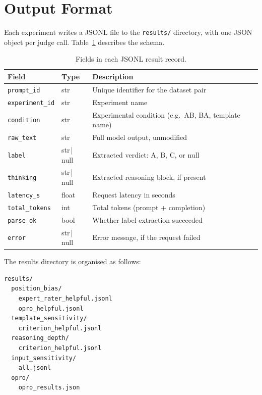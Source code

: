 \documentclass[11pt,a4paper]{article}
\begin{document}
\newpage
\section{Output Format}\label{sec:output}

Each experiment writes a JSONL file to the \texttt{results/} directory, with
one JSON object per judge call. Table~\ref{tab:fields} describes the schema.

\begin{table}[htbp]
\centering
\small
\caption{Fields in each JSONL result record.}
\label{tab:fields}
\begin{tabular}{@{}llp{7cm}@{}}
  \toprule
  \textbf{Field} & \textbf{Type} & \textbf{Description} \\
  \midrule
  \texttt{prompt\_id} & str & Unique identifier for the dataset pair \\
  \texttt{experiment\_id} & str & Experiment name \\
  \texttt{condition} & str & Experimental condition (e.g.\ AB, BA, template name) \\
  \texttt{raw\_text} & str & Full model output, unmodified \\
  \texttt{label} & str\,|\,null & Extracted verdict: A, B, C, or null \\
  \texttt{thinking} & str\,|\,null & Extracted reasoning block, if present \\
  \texttt{latency\_s} & float & Request latency in seconds \\
  \texttt{total\_tokens} & int & Total tokens (prompt + completion) \\
  \texttt{parse\_ok} & bool & Whether label extraction succeeded \\
  \texttt{error} & str\,|\,null & Error message, if the request failed \\
  \bottomrule
\end{tabular}
\end{table}

The results directory is organised as follows:

\begin{lstlisting}
results/
  position_bias/
    expert_rater_helpful.jsonl
    opro_helpful.jsonl
  template_sensitivity/
    criterion_helpful.jsonl
  reasoning_depth/
    criterion_helpful.jsonl
  input_sensitivity/
    all.jsonl
  opro/
    opro_results.json
\end{lstlisting}
\end{document}
